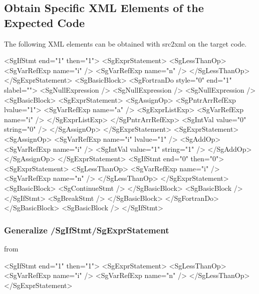 \subsection{Obtain Specific XML Elements of the Expected Code}

The following XML elements can be obtained with src2xml on the target code.

\begin{framed}
\begin{src}
<SgIfStmt end="1" then="1">
	<SgExprStatement>
		<SgLessThanOp>
			<SgVarRefExp name="i" />
			<SgVarRefExp name="n" />
		</SgLessThanOp>
	</SgExprStatement>
	<SgBasicBlock>
		<SgFortranDo style="0" end="1" slabel="">
			<SgNullExpression />
			<SgNullExpression />
			<SgNullExpression />
			<SgBasicBlock>
				<SgExprStatement>
					<SgAssignOp>
						<SgPntrArrRefExp lvalue="1">
							<SgVarRefExp name="a" />
							<SgExprListExp>
								<SgVarRefExp name="i" />
							</SgExprListExp>
						</SgPntrArrRefExp>
						<SgIntVal value="0" string="0" />
					</SgAssignOp>
				</SgExprStatement>
				<SgExprStatement>
					<SgAssignOp>
						<SgVarRefExp name="i" lvalue="1" />
						<SgAddOp>
							<SgVarRefExp name="i" />
							<SgIntVal value="1" string="1" />
						</SgAddOp>
					</SgAssignOp>
				</SgExprStatement>
				<SgIfStmt end="0" then="0">
					<SgExprStatement>
						<SgLessThanOp>
							<SgVarRefExp name="i" />
							<SgVarRefExp name="n" />
						</SgLessThanOp>
					</SgExprStatement>
					<SgBasicBlock>
						<SgContinueStmt />
					</SgBasicBlock>
					<SgBasicBlock />
				</SgIfStmt>
				<SgBreakStmt />
			</SgBasicBlock>
		</SgFortranDo>
	</SgBasicBlock>
	<SgBasicBlock />
</SgIfStmt>
\end{src}
\end{framed}

\subsubsection{Generalize /SgIfStmt/SgExprStatement}\label{subsubsec:cond}


from

\begin{framed}
\begin{src}
<SgIfStmt end="1" then="1">
	<SgExprStatement>
		<SgLessThanOp>
			<SgVarRefExp name="i" />
			<SgVarRefExp name="n" />
		</SgLessThanOp>
	</SgExprStatement>
\end{src}
\end{framed}


